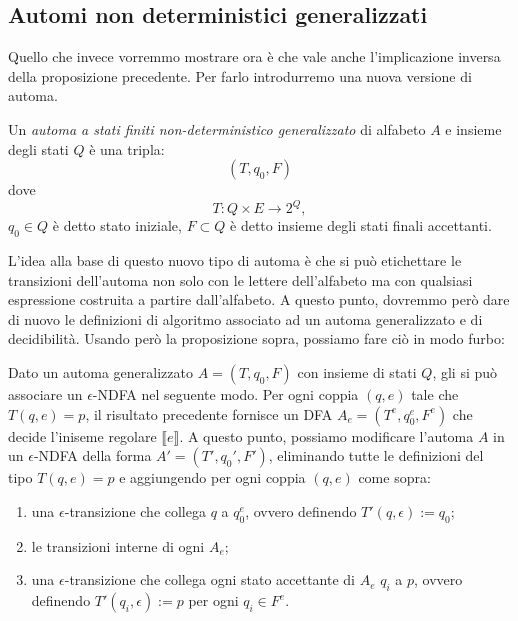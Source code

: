 \subsection{Automi non deterministici generalizzati}
Quello che invece vorremmo mostrare ora è che vale anche l'implicazione inversa della proposizione precedente. Per farlo introdurremo una nuova versione di automa.
\begin{defi}
Un \textit{automa a stati finiti non-deterministico generalizzato} di alfabeto $A$ e insieme degli stati $Q$ è una tripla:
\[
(T, q_0, F)
\]
dove
\[
T : Q \times E \to 2^Q,
\]
$q_0 \in Q$ è detto stato iniziale, $F \subset Q$ è detto insieme degli stati finali accettanti.
\end{defi}
L'idea alla base di questo nuovo tipo di automa è
che si può etichettare le transizioni dell'automa
non solo con le lettere dell'alfabeto ma con
qualsiasi espressione costruita a partire dall'alfabeto.
A questo punto, dovremmo però dare di nuovo le definizioni di
algoritmo associato ad un automa generalizzato e di decidibilità.
Usando però la proposizione sopra, possiamo fare ciò in modo furbo:
\begin{rema}
    \label{aut generalizzato a eps. NDFA}
    Dato un automa generalizzato $A=(T,q_0,F)$ con insieme di stati $Q$,
    gli si può associare un $\epsilon$-NDFA nel seguente modo.
    Per ogni coppia $(q,e)$ tale che
    $T(q,e)=p$,
    il risultato precedente fornisce un DFA $A_e=(T^e, q_0^e, F^e)$
    che decide l'iniseme regolare $\llbracket e \rrbracket$.
    A questo punto, possiamo modificare l'automa $A$ in un $\epsilon$-NDFA della forma $A'=(T', q_0', F')$, 
    eliminando tutte le definizioni del tipo
    $T(q,e)=p$ e aggiungendo per ogni coppia $(q,e)$ come sopra:
    \begin{enumerate}
        \item una $\epsilon$-transizione
        che collega $q$ a $q_0^e$, ovvero definendo $T'(q,\epsilon):=q_0$;

        \item le transizioni interne di ogni $A_e$;
        
        \item una $\epsilon$-transizione
        che collega ogni stato accettante di $A_e$ $q_i$ a $p$, ovvero definendo $T'(q_i,\epsilon):=p$ per ogni $q_i\in F^e$.
    \end{enumerate}
\end{rema}
